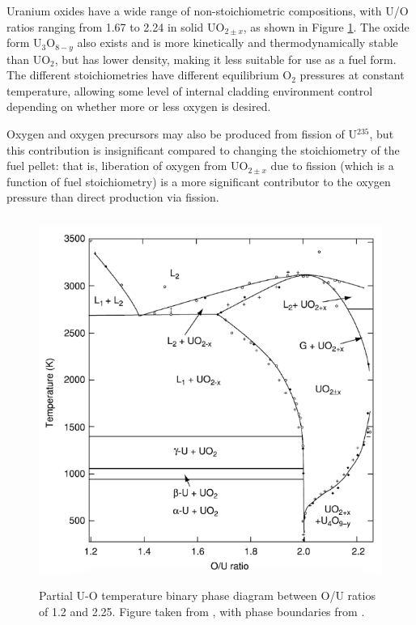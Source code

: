 Uranium oxides have a wide range of non-stoichiometric compositions, with U/O ratios ranging from 1.67 to 2.24 in solid UO$_{2 \pm x}$, as shown in Figure \ref{figure:U_O_phase_diagram}. The oxide form U$_{3}$O$_{8-y}$ also exists and is more kinetically and thermodynamically stable than UO$_{2}$, but has lower density, making it less suitable for use as a fuel form. The different stoichiometries have different equilibrium O$_{2}$ pressures at constant temperature, allowing some level of internal cladding environment control depending on whether more or less oxygen is desired. 

Oxygen and oxygen precursors may also be produced from fission of U$^{235}$, but this contribution is insignificant compared to changing the stoichiometry of the fuel pellet: that is, liberation of oxygen from UO$_{2 \pm x}$ due to fission (which is a function of fuel stoichiometry) is a more significant contributor to the oxygen pressure than direct production via fission.

\begin{figure}[ht!]
\centering
\includegraphics[height=12cm]{images/UO_phase_diagram.png}
\caption[Partial U-O temperature binary phase diagram between O/U ratios of 1.2 and 2.25.]{Partial U-O temperature binary phase diagram between O/U ratios of 1.2 and 2.25. Figure taken from \cite{katz2007chemistry}, with phase boundaries from \cite{rand1978thermodynamic, chevalier2002progress, gueneau2002thermodynamic}.}
\label{figure:U_O_phase_diagram}
\end{figure}

